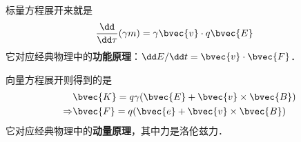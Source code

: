 标量方程展开来就是
\begin{equation}
\begin{aligned}
&\frac{\dd}{\dd\tau}(\gamma m)=\gamma \bvec{v}\cdot q\bvec{E}
\end{aligned}
\end{equation}
它对应经典物理中的\textbf{功能原理}：$\dd E/\dd t=\bvec{v}\cdot\bvec{F}$．

向量方程展开则得到的是
\begin{equation}
\begin{aligned}
&\bvec{K}=q\gamma(\bvec{E}+\bvec{v}\times\bvec{B})\\
\Rightarrow &\bvec{F}=q(\bvec{e}+\bvec{v}\times\bvec{B})
\end{aligned}
\end{equation}
它对应经典物理中的\textbf{动量原理}，其中力是洛伦兹力．






